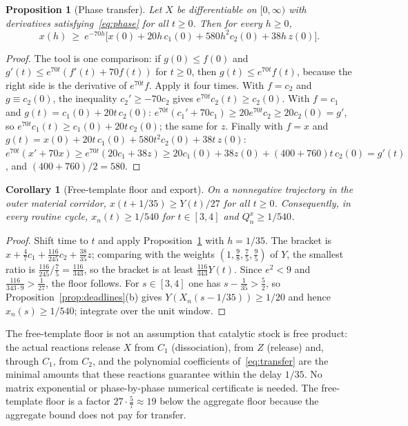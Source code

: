 \documentclass[11pt,a4paper]{article}
\theoremstyle{plain}
\newtheorem{proposition}[theorem]{Proposition}
\newtheorem{corollary}[theorem]{Corollary}
\theoremstyle{definition}
\theoremstyle{remark}
\begin{document}
\begin{proposition}[Phase transfer]\label{prop:transfer}
Let $X$ be differentiable on $[0,\infty)$ with derivatives satisfying~\eqref{eq:phase} for all $t\ge0$. Then for every $h\ge0$,
\begin{equation}\label{eq:transfer}
x(h)\ \ge\ e^{-70h}\bigl[x(0)+20h\,c_1(0)+580h^2c_2(0)+38h\,z(0)\bigr].
\end{equation}
\end{proposition}
\begin{proof}
The tool is one comparison: if $g(0)\le f(0)$ and $g'(t)\le e^{70t}(f'(t)+70f(t))$ for $t\ge0$, then $g(t)\le e^{70t}f(t)$, because the right side is the derivative of $e^{70t}f$. Apply it four times. With $f=c_2$ and $g\equiv c_2(0)$, the inequality $c_2'\ge-70c_2$ gives $e^{70t}c_2(t)\ge c_2(0)$. With $f=c_1$ and $g(t)=c_1(0)+20t\,c_2(0)$: $e^{70t}(c_1'+70c_1)\ge20e^{70t}c_2\ge20c_2(0)=g'$, so $e^{70t}c_1(t)\ge c_1(0)+20t\,c_2(0)$; the same for $z$. Finally with $f=x$ and $g(t)=x(0)+20t\,c_1(0)+580t^2c_2(0)+38t\,z(0)$: $e^{70t}(x'+70x)\ge e^{70t}(20c_1+38z)\ge20c_1(0)+38z(0)+(400+760)t\,c_2(0)=g'(t)$, and $(400+760)/2=580$.
\end{proof}

\begin{corollary}[Free-template floor and export]\label{cor:freeX}
On a nonnegative trajectory in the outer material corridor, $x(t+1/35)\ge Y(t)/27$ for all $t\ge0$. Consequently, in every routine cycle, $x_n(t)\ge1/540$ for $t\in[3,4]$ and $Q^x_n\ge1/540$.
\end{corollary}
\begin{proof}
Shift time to $t$ and apply Proposition~\ref{prop:transfer} with $h=1/35$. The bracket is $x+\tfrac47c_1+\tfrac{116}{245}c_2+\tfrac{38}{35}z$; comparing with the weights $(1,\tfrac98,\tfrac75,\tfrac95)$ of $Y$, the smallest ratio is $\tfrac{116}{245}\big/\tfrac75=\tfrac{116}{343}$, so the bracket is at least $\tfrac{116}{343}Y(t)$. Since $e^2<9$ and $\tfrac{116}{343\cdot9}>\tfrac1{27}$, the floor follows. For $s\in[3,4]$ one has $s-\tfrac1{35}>\tfrac52$, so Proposition~\ref{prop:deadlines}(b) gives $Y(X_n(s-1/35))\ge1/20$ and hence $x_n(s)\ge1/540$; integrate over the unit window.
\end{proof}
The free-template floor is not an assumption that catalytic stock is free product: the actual reactions release $X$ from $C_1$ (dissociation), from $Z$ (release) and, through $C_1$, from $C_2$, and the polynomial coefficients of~\eqref{eq:transfer} are the minimal amounts that these reactions guarantee within the delay $1/35$. No matrix exponential or phase-by-phase numerical certificate is needed. The free-template floor is a factor $27\cdot\tfrac57\approx19$ below the aggregate floor because the aggregate bound does not pay for transfer.
\end{document}
